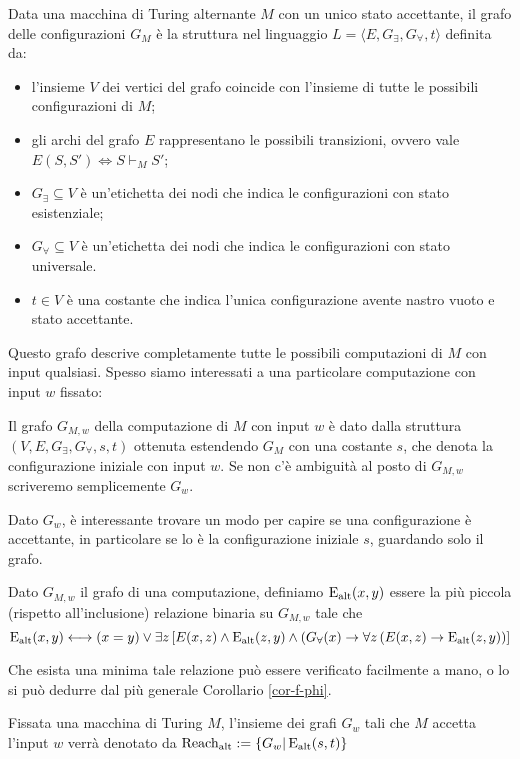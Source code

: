 \begin{definizione}
 Data una macchina di  Turing alternante $M$ con un unico stato accettante,
 il grafo delle configurazioni $G_M$
 è la struttura nel linguaggio $L=\langle E, G_\exists, G_\forall, t\rangle$
 definita da:
 \begin{itemize}
  \item l'insieme $V$ dei vertici del grafo coincide con l'insieme di tutte le
  possibili configurazioni di $M$;
  \item gli archi del grafo $E$ rappresentano le possibili transizioni, ovvero
  vale $E(S,S') \iff S \vdash_M S'$;
  \item $G_\exists \subseteq V$ è un'etichetta dei nodi che indica le configurazioni
  con stato esistenziale;
  \item $G_\forall \subseteq V$ è un'etichetta dei nodi che indica le configurazioni
  con stato universale.
  \item $t \in V$ è una costante che indica l'unica configurazione avente nastro
  vuoto e stato accettante.
 \end{itemize}
\end{definizione}
Questo grafo descrive completamente tutte le possibili computazioni di $M$ con
input qualsiasi. Spesso siamo interessati a una particolare computazione
con input $w$ fissato:
\begin{definizione}
 Il grafo $G_{M,w}$
 della computazione di $M$ con input $w$ è dato dalla
 struttura $(V,E, G_\exists, G_\forall, s, t)$ ottenuta estendendo $G_M$
 con una costante $s$, che denota la configurazione iniziale con input $w$.
 Se non c'è ambiguità al posto di $G_{M,w}$ scriveremo semplicemente $G_w$.
\end{definizione}
Dato $G_w$, è interessante trovare un modo per capire se una configurazione
è accettante, in particolare se lo è la configurazione iniziale $s$, guardando
solo il grafo.
\begin{definizione}
\label{def:Ealt}
 Dato $G_{M,w}$ il grafo di una computazione,
 definiamo $\operatorname{E_{alt}}(x,y)$ essere la
 più piccola (rispetto all'inclusione) relazione binaria su $G_{M,w}$ tale che
 \[
  \operatorname{E_{alt}}(x,y) \longleftrightarrow (x=y) \lor \exists z 
  \left[ E(x,z) \land \operatorname{E_{alt}}(z,y) \land (G_\forall(x) \rightarrow \forall z\left(E(x,z) \rightarrow \operatorname{E_{alt}}(z,y)\right)\right]
 \]
\end{definizione}
Che esista una minima tale relazione può essere verificato facilmente a mano, o
lo si può dedurre dal più generale Corollario \ref{cor-f-phi}.
\begin{definizione}
\label{def:Ralt}
 Fissata una macchina di Turing $M$,
 l'insieme dei grafi $G_w$ tali che $M$ accetta l'input $w$ verrà denotato da
 $\operatorname{Reach_{alt}} := \{G_w | \operatorname{E_{alt}}(s,t) \}$
\end{definizione}


